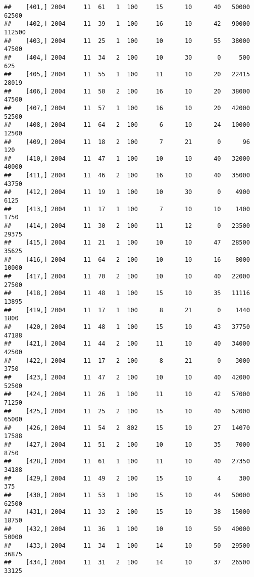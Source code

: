\documentclass{article}\usepackage[]{graphicx}\usepackage[]{color}
\makeatletter
\newenvironment{kframe}{%
 \def\at@end@of@kframe{}%
 \ifinner\ifhmode%
  \def\at@end@of@kframe{\end{minipage}}%
  \begin{minipage}{\columnwidth}%
 \fi\fi%
 \def\FrameCommand##1{\hskip\@totalleftmargin \hskip-\fboxsep
 \colorbox{shadecolor}{##1}\hskip-\fboxsep
     \hskip-\linewidth \hskip-\@totalleftmargin \hskip\columnwidth}%
 \MakeFramed {\advance\hsize-\width
   \@totalleftmargin\z@ \linewidth\hsize
   \@setminipage}}%
 {\par\unskip\endMakeFramed%
 \at@end@of@kframe}
\newenvironment{knitrout}{}{} %
\makeatother
\begin{document}
\begin{knitrout}
\begin{kframe}
\begin{verbatim}
##    [401,] 2004     11  61   1  100     15      10      40   50000   62500
##    [402,] 2004     11  39   1  100     16      10      42   90000  112500
##    [403,] 2004     11  25   1  100     10      10      55   38000   47500
##    [404,] 2004     11  34   2  100     10      30       0     500     625
##    [405,] 2004     11  55   1  100     11      10      20   22415   28019
##    [406,] 2004     11  50   2  100     16      10      20   38000   47500
##    [407,] 2004     11  57   1  100     16      10      20   42000   52500
##    [408,] 2004     11  64   2  100      6      10      24   10000   12500
##    [409,] 2004     11  18   2  100      7      21       0      96     120
##    [410,] 2004     11  47   1  100     10      10      40   32000   40000
##    [411,] 2004     11  46   2  100     16      10      40   35000   43750
##    [412,] 2004     11  19   1  100     10      30       0    4900    6125
##    [413,] 2004     11  17   1  100      7      10      10    1400    1750
##    [414,] 2004     11  30   2  100     11      12       0   23500   29375
##    [415,] 2004     11  21   1  100     10      10      47   28500   35625
##    [416,] 2004     11  64   2  100     10      10      16    8000   10000
##    [417,] 2004     11  70   2  100     10      10      40   22000   27500
##    [418,] 2004     11  48   1  100     15      10      35   11116   13895
##    [419,] 2004     11  17   1  100      8      21       0    1440    1800
##    [420,] 2004     11  48   1  100     15      10      43   37750   47188
##    [421,] 2004     11  44   2  100     11      10      40   34000   42500
##    [422,] 2004     11  17   2  100      8      21       0    3000    3750
##    [423,] 2004     11  47   2  100     10      10      40   42000   52500
##    [424,] 2004     11  26   1  100     11      10      42   57000   71250
##    [425,] 2004     11  25   2  100     15      10      40   52000   65000
##    [426,] 2004     11  54   2  802     15      10      27   14070   17588
##    [427,] 2004     11  51   2  100     10      10      35    7000    8750
##    [428,] 2004     11  61   1  100     11      10      40   27350   34188
##    [429,] 2004     11  49   2  100     15      10       4     300     375
##    [430,] 2004     11  53   1  100     15      10      44   50000   62500
##    [431,] 2004     11  33   2  100     15      10      38   15000   18750
##    [432,] 2004     11  36   1  100     10      10      50   40000   50000
##    [433,] 2004     11  34   1  100     14      10      50   29500   36875
##    [434,] 2004     11  31   2  100     14      10      37   26500   33125

\end{verbatim}
\end{kframe}
\end{knitrout}
\end{document}
